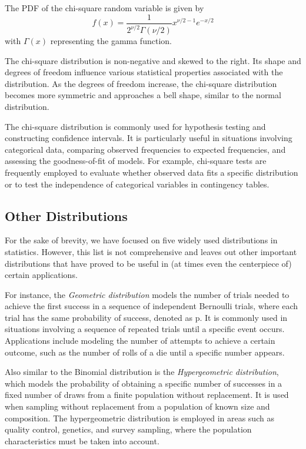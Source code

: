 \documentclass{article}
\begin{document}
The PDF of the chi-square random variable is given by
$$
f(x) = \frac{1}{2^{\nu / 2} \Gamma(\nu / 2)} x^{\nu/2 - 1} e^{-x/2}
$$
with $\Gamma(x)$ representing the gamma function.

The chi-square distribution is non-negative and skewed to the right. Its shape and degrees of freedom influence various statistical properties associated with the distribution. As the degrees of freedom increase, the chi-square distribution becomes more symmetric and approaches a bell shape, similar to the normal distribution.

The chi-square distribution is commonly used for hypothesis testing and constructing confidence intervals. It is particularly useful in situations involving categorical data, comparing observed frequencies to expected frequencies, and assessing the goodness-of-fit of models. For example, chi-square tests are frequently employed to evaluate whether observed data fits a specific distribution or to test the independence of categorical variables in contingency tables.

\subsection{Other Distributions}

For the sake of brevity, we have focused on five widely used distributions in statistics. However, this list is not comprehensive and leaves out other important distributions that have proved to be useful in (at times even the centerpiece of) certain applications.

For instance, the \emph{Geometric distribution} models the number of trials needed to achieve the first success in a sequence of independent Bernoulli trials, where each trial has the same probability of success, denoted as p. It is commonly used in situations involving a sequence of repeated trials until a specific event occurs. Applications include modeling the number of attempts to achieve a certain outcome, such as the number of rolls of a die until a specific number appears.

Also similar to the Binomial distribution is the \emph{Hypergeometric distribution}, which models the probability of obtaining a specific number of successes in a fixed number of draws from a finite population without replacement. It is used when sampling without replacement from a population of known size and composition. The hypergeometric distribution is employed in areas such as quality control, genetics, and survey sampling, where the population characteristics must be taken into account.
\end{document}
